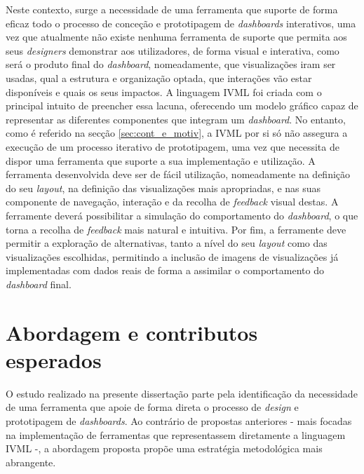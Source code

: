 Neste contexto, surge a necessidade de uma ferramenta que suporte de forma eficaz todo o processo de conceção e prototipagem de \textit{dashboards} interativos, uma vez que atualmente não existe nenhuma ferramenta de suporte que permita aos seus \textit{designers} demonstrar aos utilizadores, de forma visual e interativa, como será o produto final do \textit{dashboard}, nomeadamente, que visualizações iram ser usadas, qual a estrutura e organização optada, que interações vão estar disponíveis e quais os seus impactos. A linguagem \gls{IVML} foi criada com o principal intuito de preencher essa lacuna, oferecendo um modelo gráfico capaz de representar as diferentes componentes que integram um \textit{dashboard}. No entanto, como é referido na secção \ref{sec:cont_e_motiv}, a \gls{IVML} por si só não assegura a execução de um processo iterativo de prototipagem, uma vez que necessita de dispor uma ferramenta que suporte a sua implementação e utilização. A ferramenta desenvolvida deve ser de fácil utilização, nomeadamente na definição do seu \textit{layout}, na definição das visualizações mais apropriadas, e nas suas componente de navegação, interação e da recolha de \textit{feedback} visual destas. A ferramente deverá possibilitar a simulação do comportamento do \textit{dashboard}, o que torna a recolha de \textit{feedback} mais natural e intuitiva. Por fim, a ferramente deve permitir a exploração de alternativas, tanto a nível do seu \textit{layout} como das visualizações escolhidas, permitindo a inclusão de imagens de visualizações já implementadas com dados reais de forma a assimilar o comportamento do \textit{dashboard} final.

\section{Abordagem e contributos esperados}
\label{sec:contribuicoes}

O estudo realizado na presente dissertação parte pela identificação da necessidade de uma ferramenta que apoie de forma direta o processo de \textit{design} e prototipagem de \textit{dashboards}. Ao contrário de propostas anteriores - mais focadas na implementação de ferramentas que representassem diretamente a linguagem \gls{IVML} -, a abordagem proposta propõe uma estratégia metodológica mais abrangente.

